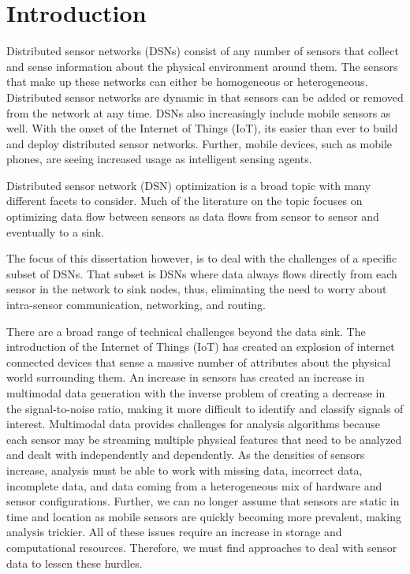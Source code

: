 \chapter{Introduction}\label{ch:introduction}
Distributed sensor networks (DSNs) consist of any number of sensors that collect and sense information about the physical environment around them. The sensors that make up these networks can either be homogeneous or heterogeneous. Distributed sensor networks are dynamic in that sensors can be added or removed from the network at any time. DSNs also increasingly include mobile sensors as well. With the onset of the Internet of Things (IoT), its easier than ever to build and deploy distributed sensor networks. Further, mobile devices, such as mobile phones, are seeing increased usage as intelligent sensing agents.

Distributed sensor network (DSN) optimization is a broad topic with many different facets to consider. Much of the literature on the topic focuses on optimizing data flow between sensors as data flows from sensor to sensor and eventually to a sink.

The focus of this dissertation however, is to deal with the challenges of a specific subset of DSNs. That subset is DSNs where data always flows directly from each sensor in the network to sink nodes, thus, eliminating the need to worry about intra-sensor communication, networking, and routing.

There are a broad range of technical challenges beyond the data sink. The introduction of the Internet of Things (IoT) has created an explosion of internet connected devices that sense a massive number of attributes about the physical world surrounding them. An increase in sensors has created an increase in multimodal data generation with the inverse problem of creating a decrease in the signal-to-noise ratio, making it more difficult to identify and classify signals of interest. Multimodal data provides challenges for analysis algorithms because each sensor may be streaming multiple physical features that need to be analyzed and dealt with independently and dependently. As the densities of sensors increase, analysis must be able to work with missing data, incorrect data, incomplete data, and data coming from a heterogeneous mix of hardware and sensor configurations. Further, we can no longer assume that sensors are static in time and location as mobile sensors are quickly becoming more prevalent, making analysis trickier. All of these issues require an increase in storage and computational resources. Therefore, we must find approaches to deal with sensor data to lessen these hurdles.

